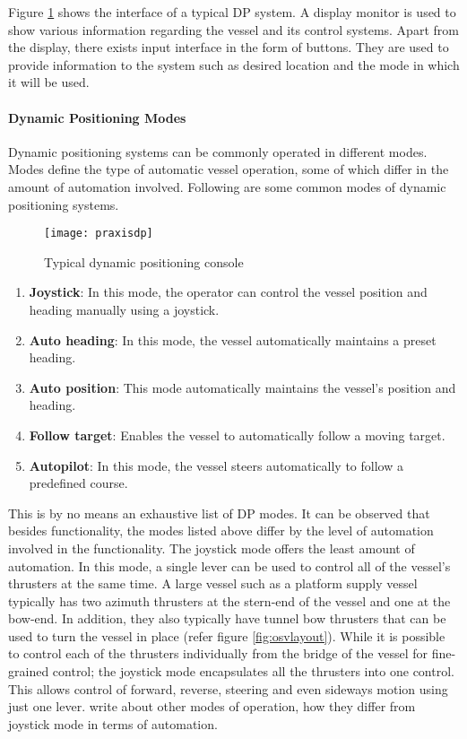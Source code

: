 
Figure \ref{fig:praxisdp} shows the interface of a typical DP system. A display monitor is used to show various information regarding the vessel and its control systems. Apart from the display, there exists input interface in the form of buttons. They are used to provide information to the system such as desired location and the mode in which it will be used. 

\paragraph{Dynamic Positioning Modes}
Dynamic positioning systems can be commonly operated in different modes. Modes define the type of automatic vessel operation, some of which differ in the amount of automation involved. Following are some common modes of dynamic positioning systems. 

\begin{figure}
	\centering
	\texttt{[image: praxisdp]}
	\caption{Typical dynamic positioning console}
	\label{fig:praxisdp}
\end{figure}

\begin{enumerate}

\item \textbf{Joystick}: In this mode, the operator can control the vessel position and heading manually using a joystick. 
\item \textbf{Auto heading}: In this mode, the vessel automatically maintains a preset heading. 
\item \textbf{Auto position}: This mode automatically maintains the vessel's position and heading. 
\item \textbf{Follow target}: Enables the vessel to automatically follow a moving target. 
\item \textbf{Autopilot}: In this mode, the vessel steers automatically to follow a predefined course. 

\end{enumerate}

This is by no means an exhaustive list of DP modes. It can be observed that besides functionality, the modes listed above differ by the level of automation involved in the functionality. The joystick mode offers the least amount of automation. In this mode, a single lever can be used to control all of the vessel's thrusters at the same time. A large vessel such as a platform supply vessel typically has two azimuth thrusters at the stern-end of the vessel and one at the bow-end. In addition, they also typically have tunnel bow thrusters that can be used to turn the vessel in place (refer figure \ref{fig:osvlayout}). While it is possible to control each of the thrusters individually from the bridge of the vessel for fine-grained control; the joystick mode encapsulates all the thrusters into one control. This allows control of forward, reverse, steering and even sideways motion using just one lever. \todo[inline]write about other modes of operation, how they differ from joystick mode in terms of automation. 

